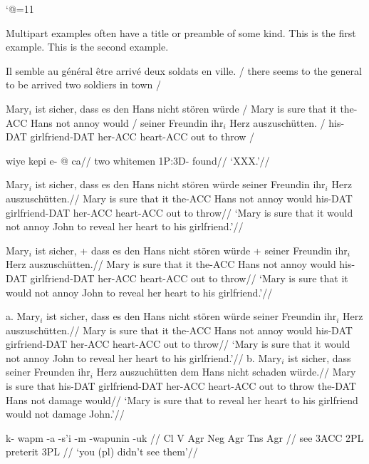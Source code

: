
\let\small=\sevenrm
\begingroup
\catcode`@=11
\def\@nil{\relax}
\endgroup

\pex Multipart examples often have a title or preamble of some kind.
\a This is the first example.
\a This is the second example.
\xe

\ex
\begingl
\gla Il semble au g\'en\'eral \^etre arriv\'e deux soldats en
ville. /
\glb there seems {to the} general {to be} arrived two soldiers in
town /
\endgl
\xe

\def\suff#1{{-\small #1}}%

\ex[abovemoreglskip=.5ex,moregloffset=1em,aboveglcskip=1ex]
\begingl
\gla Mary$_i$ ist sicher, dass es den Hans nicht st\"oren w\"urde /
\glb Mary is sure that it the\suff{ACC} Hans not annoy would /
\moregl
\gla seiner Freundin ihr$_i$ Herz auszusch\"utten. /
\glb his\suff{DAT} girlfriend\suff{DAT} her\suff{ACC} heart\suff{ACC}
{out to throw} /
\endgl
\xe

\let\sc=\tenrm
\ex
\begingl
\gla wiye kepi e- @ ca//
\glb two whitemen \sc1P:3D- found//
\glft `XXX.'//
\endgl
\xe


\ex
\begingl
\gla Mary$_i$ ist sicher, dass es den Hans nicht st\"oren w\"urde
seiner Freundin ihr$_i$ Herz auszusch\"utten.//
\glb Mary is sure that it the\suff{ACC} Hans not annoy would
his\suff{DAT} girlfriend\suff{DAT} her\suff{ACC} heart\suff{ACC} {out to
throw}//
\glft  `Mary is sure that it would not annoy John to reveal her
heart to his girlfriend.'//
\endgl
\xe

\ex
\begingl
\gla Mary$_i$ ist sicher, + dass es den Hans nicht st\"oren w\"urde
+ seiner Freundin ihr$_i$ Herz auszusch\"utten.//
\glb Mary is sure that it the\suff{ACC} Hans not annoy would
his\suff{DAT} girlfriend\suff{DAT} her\suff{ACC} heart\suff{ACC} {out to
throw}//
\glft  `Mary is sure that it would not annoy John to reveal her
heart to his girlfriend.'//
\endgl
\xe

\ex
a.\quad
\begingl[glwidth=.4\hsize]
\gla Mary$_i$ ist sicher, dass es den Hans nicht st\"oren w\"urde
seiner Freundin ihr$_i$ Herz auszusch\"utten.//
\glb Mary is sure that it the\suff{ACC} Hans not annoy would
his\suff{DAT} girfriend\suff{DAT} her\suff{ACC} heart\suff{ACC} {out to
throw}//
\glft  `Mary is sure that it would not annoy John to reveal her
heart to his girlfriend.'//
\endgl
\hfil
b.\quad
\begingl[glwidth=.4\hsize]
\gla Mary$_i$ ist sicher, dass seiner Freunden ihr$_i$ Herz
auszuch\"utten dem Hans nicht schaden w\"urde.//
\glb Mary is sure that his\suff{DAT} girlfriend\suff{DAT} her\suff{ACC}
heart\suff{ACC} {out to throw} the\suff{DAT} Hans not damage would//
\glft `Mary is sure that to reveal her heart to his girlfriend
would not damage John.'//
\endgl
\xe



\ex[glstyle=multilevel,everygla=,everyglb=,everyglc=,
   aboveglaskip=0pt,aboveglbskip=0pt,aboveglftskip=1ex]
\begingl
\gla k- wapm -a -s'i -m -wapunin -uk //
\glb Cl V Agr Neg Agr Tns Agr //
 see {3\sc ACC} {} 2{\sc PL} preterit 3{\sc PL} //
\glft `you (pl) didn't see them'//
\endgl
\xe

\bye
